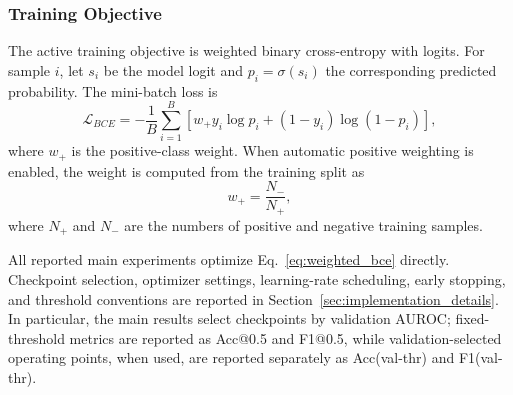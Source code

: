 \subsubsection{Training Objective}
\label{sec:loss_function_training_objective}

The active training objective is weighted binary cross-entropy with logits.
For sample $i$, let $s_i$ be the model logit and
$p_i=\sigma(s_i)$ the corresponding predicted probability. The mini-batch loss
is
\begin{equation}
  \mathcal{L}_{BCE}
  =
  -\frac{1}{B}
  \sum_{i=1}^{B}
  \left[
    w_{+}y_i\log p_i
    +(1-y_i)\log(1-p_i)
  \right],
  \label{eq:weighted_bce}
\end{equation}
where $w_{+}$ is the positive-class weight. When automatic positive weighting is
enabled, the weight is computed from the training split as
\begin{equation}
  w_{+} =
  \frac{N_{-}}{N_{+}},
  \label{eq:pos_weight}
\end{equation}
where $N_{+}$ and $N_{-}$ are the numbers of positive and negative training
samples.

All reported main experiments optimize Eq.~\ref{eq:weighted_bce} directly.
Checkpoint selection, optimizer settings, learning-rate scheduling, early
stopping, and threshold conventions are reported in
Section~\ref{sec:implementation_details}. In particular, the main results select
checkpoints by validation AUROC; fixed-threshold metrics are reported as
Acc@0.5 and F1@0.5, while validation-selected operating points, when used, are
reported separately as Acc(val-thr) and F1(val-thr).
